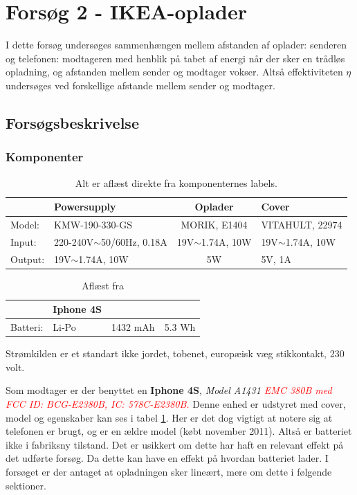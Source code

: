 \section{Forsøg 2 - IKEA-oplader}

I dette forsøg undersøges sammenhængen mellem afstanden af oplader: senderen og telefonen: modtageren med henblik på tabet af energi når der sker en trådløs opladning, og afstanden mellem sender og modtager vokser. Altså effektiviteten $\eta$ undersøges ved forskellige afstande mellem sender og modtager.

\subsection{Forsøgsbeskrivelse}
\subsubsection{Komponenter}

\begin{table}[htbp] %
\label{sender}
\begin{tabular}{l|l|c|l}
        & Powersupply                  & Oplader             & Cover               \\ \hline
Model:  & KMW-190-330-GS               & MORIK, E1404        & VITAHULT, 22974     \\
Input:  & 220-240V$\sim$50/60Hz, 0.18A & 19V$\sim$1.74A, 10W & 19V$\sim$1.74A, 10W \\
Output: & 19V$\sim$1.74A, 10W          & 5W                  & 5V, 1A             
\end{tabular}
\caption{Alt er aflæst direkte fra komponenternes labels.}
\end{table}

\begin{table}[htbp]
\label{table:batteri}
\begin{tabular}{l|lcl}
         & Iphone 4S &          &        \\ \hline
Batteri: & Li-Po     & 1432 mAh & 5.3 Wh
\end{tabular}
\caption{Aflæst fra \cite{batteri}}
\end{table}

Strømkilden er et standart ikke jordet, tobenet, europæisk væg stikkontakt, 230 volt.

Som modtager er der benyttet en \textbf{Iphone 4S}, \textit{Model A1431 \textcolor{red}{EMC 380B med FCC ID: BCG-E2380B, IC: 578C-E2380B.}} 
Denne enhed er udstyret med cover, model og egenskaber kan ses i tabel \ref{sender}. Her er det dog vigtigt at notere sig at telefonen er brugt, og er en ældre model (købt november 2011). Altså er batteriet ikke i fabriksny tilstand. Det er usikkert om dette har haft en relevant effekt på det udførte forsøg. Da dette kan have en effekt på hvordan batteriet lader. I forsøget er der antaget at opladningen sker lineært, mere om dette i følgende sektioner.


